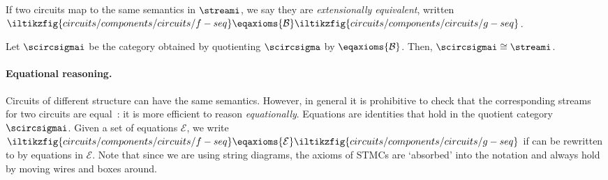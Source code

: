 \documentclass[10pt]{article}
\begin{document}
    \noindent
    If two circuits map to the same semantics in \(\streami\), we say they are \emph{extensionally equivalent}, written \(\iltikzfig{circuits/components/circuits/f-seq} \eqaxioms{\mathcal{B}} \iltikzfig{circuits/components/circuits/g-seq}\).

    \begin{theorem}
        Let \(\scircsigmai\) be the category obtained by quotienting \(\scircsigma\) by \(\eqaxioms{\mathcal{B}}\).
        Then, \(\scircsigmai \cong \streami\).
    \end{theorem}

    \paragraph*{Equational reasoning.}

    Circuits of different structure can have the same semantics.
    However, in general it is prohibitive to check that the corresponding streams for two circuits are equal~\cite{ghica2017diagrammatica}: it is more efficient to reason \emph{equationally}.
    Equations are identities that hold in the quotient category \(\scircsigmai\).
    Given a set of equations \(\mathcal{E}\), we write \(\iltikzfig{circuits/components/circuits/f-seq} \eqaxioms{\mathcal{E}} \iltikzfig{circuits/components/circuits/g-seq}\) if  can be rewritten to  by equations in \(\mathcal{E}\).
    Note that since we are using string diagrams, the axioms of STMCs are `absorbed' into the notation and always hold by moving wires and boxes around.
\end{document}
